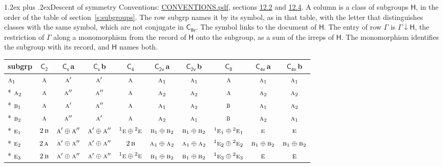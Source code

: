\documentclass[10pt,a4paper]{article}
\makeatletter
\renewcommand\section{\@startsection{section}{1}{\z@}{-3ex plus -1ex minus -.2ex}%
  {1.2ex plus .2ex}{\normalfont\large\sffamily\bfseries\color{parttitle}}}
\numberwithin{equation}{section}
\newcommand{\grp}[1]{\mathsf{#1}}
\newcommand{\irr}[1]{\text{\normalfont\scshape #1}}
\newcommand{\conjpair}[1]{{}^{#1}}
\newcommand{\clsletter}[1]{\,{\scriptsize\color{black!55}#1}}
\newcommand{\restr}[2]{#1\!\downarrow#2}
\makeatother
\begin{document}
\section{Descent of symmetry}\label{s:subduction}
Conventions: \href{../../CONVENTIONS.pdf}{CONVENTIONS.pdf}, sections \href{../../CONVENTIONS.pdf\#conv.12.2}{12.2} and \href{../../CONVENTIONS.pdf\#conv.12.4}{12.4}.
A column is a class of subgroups $\grp{H}$, in the order of the table of section~\ref{s:subgroups}. The row subgrp names it by its symbol, as in that table, with the letter that distinguishes classes with the same symbol, which are not conjugate in $\grp{C_{8v}}$. The symbol links to the document of $\grp{H}$. The entry of row $\Gamma$ is $\restr{\Gamma}{\grp{H}}$, the restriction of $\Gamma$ along a monomorphism from the record of $\grp{H}$ onto the subgroup, as a sum of the irreps of $\grp{H}$. The monomorphism identifies the subgroup with its record, and $\grp{H}$ names both.
{\small\begin{longtable}{@{}lccccccccc@{}}\toprule
subgrp & \href{C2.pdf}{$\grp{C_{2}}$} & \href{C1v.pdf}{$\grp{C_{s}}$}\clsletter{a} & \href{C1v.pdf}{$\grp{C_{s}}$}\clsletter{b} & \href{C4.pdf}{$\grp{C_{4}}$} & \href{C2v.pdf}{$\grp{C_{2v}}$}\clsletter{a} & \href{C2v.pdf}{$\grp{C_{2v}}$}\clsletter{b} & \href{C8.pdf}{$\grp{C_{8}}$} & \href{C4v.pdf}{$\grp{C_{4v}}$}\clsletter{a} & \href{C4v.pdf}{$\grp{C_{4v}}$}\clsletter{b}\\\midrule\endhead
\bottomrule\endfoot\endlastfoot
$\irr{a}_{1}$ & $\irr{a}$ & $\irr{a}'$ & $\irr{a}'$ & $\irr{a}$ & $\irr{a}_{1}$ & $\irr{a}_{1}$ & $\irr{a}$ & $\irr{a}_{1}$ & $\irr{a}_{1}$\\*
$\irr{a}_{2}$ & $\irr{a}$ & $\irr{a}''$ & $\irr{a}''$ & $\irr{a}$ & $\irr{a}_{2}$ & $\irr{a}_{2}$ & $\irr{a}$ & $\irr{a}_{2}$ & $\irr{a}_{2}$\\*
$\irr{b}_{1}$ & $\irr{a}$ & $\irr{a}'$ & $\irr{a}''$ & $\irr{a}$ & $\irr{a}_{1}$ & $\irr{a}_{2}$ & $\irr{b}$ & $\irr{a}_{1}$ & $\irr{a}_{2}$\\*
$\irr{b}_{2}$ & $\irr{a}$ & $\irr{a}''$ & $\irr{a}'$ & $\irr{a}$ & $\irr{a}_{2}$ & $\irr{a}_{1}$ & $\irr{b}$ & $\irr{a}_{2}$ & $\irr{a}_{1}$\\*
$\irr{e}_{1}$ & $2\,\irr{b}$ & $\irr{a}'\oplus \irr{a}''$ & $\irr{a}'\oplus \irr{a}''$ & $\conjpair{1}\irr{e}\oplus \conjpair{2}\irr{e}$ & $\irr{b}_{1}\oplus \irr{b}_{2}$ & $\irr{b}_{1}\oplus \irr{b}_{2}$ & $\conjpair{1}\irr{e}_{1}\oplus \conjpair{2}\irr{e}_{1}$ & $\irr{e}$ & $\irr{e}$\\*
$\irr{e}_{2}$ & $2\,\irr{a}$ & $\irr{a}'\oplus \irr{a}''$ & $\irr{a}'\oplus \irr{a}''$ & $2\,\irr{b}$ & $\irr{a}_{1}\oplus \irr{a}_{2}$ & $\irr{a}_{1}\oplus \irr{a}_{2}$ & $\conjpair{1}\irr{e}_{2}\oplus \conjpair{2}\irr{e}_{2}$ & $\irr{b}_{1}\oplus \irr{b}_{2}$ & $\irr{b}_{1}\oplus \irr{b}_{2}$\\*
$\irr{e}_{3}$ & $2\,\irr{b}$ & $\irr{a}'\oplus \irr{a}''$ & $\irr{a}'\oplus \irr{a}''$ & $\conjpair{1}\irr{e}\oplus \conjpair{2}\irr{e}$ & $\irr{b}_{1}\oplus \irr{b}_{2}$ & $\irr{b}_{1}\oplus \irr{b}_{2}$ & $\conjpair{1}\irr{e}_{3}\oplus \conjpair{2}\irr{e}_{3}$ & $\irr{e}$ & $\irr{e}$\\
\bottomrule\end{longtable}}
\end{document}
